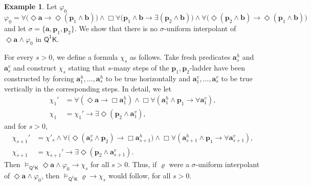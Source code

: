 \documentclass[10pt,a4paper]{amsart}
\theoremstyle{plain}
\theoremstyle{definition}
\newtheorem{exa}[thm]{Example}
\newcommand{\FOMK}{\ensuremath{\mathsf{Q^1K}}}
\newcommand{\fform}[1]{\boldsymbol{#1}}
\newcommand{\pvar}{\fform{p}}
\newcommand{\avar}{\fform{a}}
\newcommand{\bvar}{\fform{b}}
\newcommand{\Bv}{\forall}
\newcommand{\Bh}{\Box}
\newcommand{\Dv}{\exists}
\newcommand{\Dh}{\Diamond}
\begin{document}
\begin{exa}\label{ex62}
	Let $\varphi_{0}$ %
	$$
	\varphi_{0} = \Bv \bigl(\Dh\avar \rightarrow \Dh (\pvar_{1} \wedge \bvar)\bigr) \land 
	\Bh \Bv \bigl(\pvar_{1} \wedge \bvar \rightarrow \Dv (\pvar_{2} \wedge \bvar)\bigr)\land
	\Bv \bigl(\Dh (\pvar_{2} \wedge \bvar) \rightarrow \Dh (\pvar_1 \wedge \bvar)\bigr)
	$$
	and let $\sigma=\{\avar,\pvar_{1},\pvar_{2}\}$.  
	We show that there is no $\sigma$-uniform interpolant of
	$\Diamond \avar \wedge \varphi_{0}$ in $\FOMK{}$.  
	
	For every $s>0$, we define a formula $\chi_{s}$ as follows. Take fresh predicates $\avar_{s}^h$ and $\avar_{s}^v$ and construct
	$\chi_{s}$ stating that $s$-many steps of the $\pvar_{1},\pvar_{2}$-ladder have been constructed by forcing $\avar_{1}^h,\ldots,\avar_{s}^h$ to be true
	horizontally and $\avar_{1}^v,\ldots,\avar_{s}^v$ to be true vertically in the corresponding steps.  
	In detail, we let
	\begin{align*}
		\chi_{1}' & = \Bv(\Dh\avar \rightarrow \Box \avar_{1}^h) \wedge \Bh\Bv (\avar_{1}^h \wedge \pvar_{1} \rightarrow \Bv \avar_{1}^v),\\
		\chi_{1} & = \chi_{1}' \rightarrow \exists \Diamond (\pvar_{2} \wedge \avar_{1}^v),
	\end{align*}	
	and for $s>0$,
	\begin{align*}
		\chi_{s+1}' & = \chi'_s\land\Bv\bigl(\Dh(\avar_s^v\land\pvar_2) \rightarrow \Box \avar_{s+1}^h\bigr)  
		\wedge \Bh\Bv (\avar_{s+1}^h \wedge \pvar_{1} \rightarrow \Bv \avar_{s+1}^v),\\
		\chi_{s+1} & = \chi_{s+1}' \rightarrow \exists \Diamond (\pvar_{2} \wedge \avar_{s+1}^v).
	\end{align*}	
	Then $\models_\FOMK \Diamond \avar\land \varphi_0\to \chi_s$ for all $s>0$.
	Thus, if $\varrho$ were a $\sigma$-uniform interpolant of $\Diamond \avar\land\varphi_0$, then
	$\models_\FOMK\varrho\to \chi_s$ would follow, for all $s>0$.
	

\end{exa}
\end{document}
